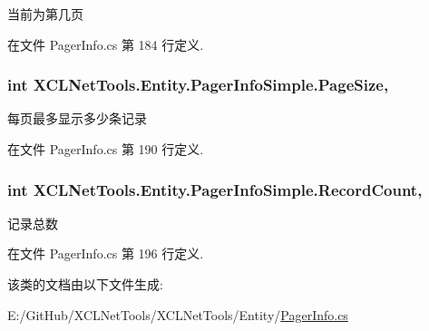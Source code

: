 当前为第几页 



在文件 Pager\+Info.\+cs 第 184 行定义.

\subsubsection[{\texorpdfstring{Page\+Size}{PageSize}}]{\setlength{\rightskip}{0pt plus 5cm}int X\+C\+L\+Net\+Tools.\+Entity.\+Pager\+Info\+Simple.\+Page\+Size\hspace{0.3cm}{\ttfamily [get]}, {\ttfamily [set]}}\hypertarget{class_x_c_l_net_tools_1_1_entity_1_1_pager_info_simple_a3a8883f09f14d322edc5e8be13f75cb6}{}\label{class_x_c_l_net_tools_1_1_entity_1_1_pager_info_simple_a3a8883f09f14d322edc5e8be13f75cb6}


每页最多显示多少条记录 



在文件 Pager\+Info.\+cs 第 190 行定义.

\subsubsection[{\texorpdfstring{Record\+Count}{RecordCount}}]{\setlength{\rightskip}{0pt plus 5cm}int X\+C\+L\+Net\+Tools.\+Entity.\+Pager\+Info\+Simple.\+Record\+Count\hspace{0.3cm}{\ttfamily [get]}, {\ttfamily [set]}}\hypertarget{class_x_c_l_net_tools_1_1_entity_1_1_pager_info_simple_abe1bab597cad994b4515208cbb77f0bf}{}\label{class_x_c_l_net_tools_1_1_entity_1_1_pager_info_simple_abe1bab597cad994b4515208cbb77f0bf}


记录总数 



在文件 Pager\+Info.\+cs 第 196 行定义.



该类的文档由以下文件生成\+:\begin{DoxyCompactItemize}
\item 
E\+:/\+Git\+Hub/\+X\+C\+L\+Net\+Tools/\+X\+C\+L\+Net\+Tools/\+Entity/\hyperlink{_pager_info_8cs}{Pager\+Info.\+cs}\end{DoxyCompactItemize}
